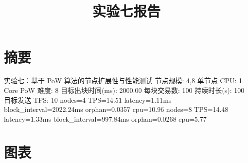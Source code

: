 \documentclass{ctexart}
\title{实验七报告}
\date{}
\begin{document}
\maketitle
\section*{摘要}
实验七：基于 PoW 算法的节点扩展性与性能测试
节点规模: 4,8
单节点 CPU: 1 Core
PoW 难度: 8
目标出块时间(ms): 2000.00
每块交易数: 100
持续时长(s): 100
目标发送 TPS: 10
nodes=4 TPS=14.51 latency=1.11ms block_interval=2022.24ms orphan=0.0357 cpu=10.96%
nodes=8 TPS=14.48 latency=1.33ms block_interval=997.84ms orphan=0.0268 cpu=5.77%
\section*{图表}
\end{document}
